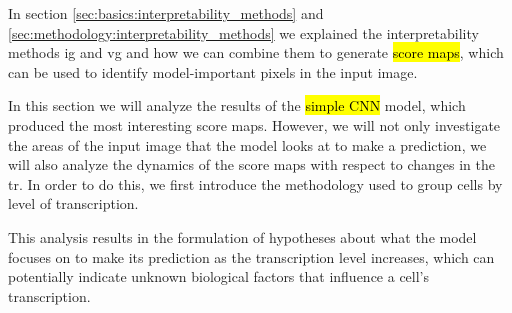 
\glsresetall
\graphicspath{{./Sections/Results/Resources/}}

In section \ref{sec:basics:interpretability_methods} and \ref{sec:methodology:interpretability_methods} we explained the interpretability methods \gls{ig} and \gls{vg} and how we can combine them to generate \hl{score maps}, which can be used to identify model-important pixels in the input image.

In this section we will analyze the results of the \hl{simple CNN} model, which produced the most interesting score maps. However, we will not only investigate the areas of the input image that the model looks at to make a prediction, we will also analyze the dynamics of the score maps with respect to changes in the \gls{tr}. In order to do this, we first introduce the methodology used to group cells by level of transcription.

This analysis results in the formulation of hypotheses about what the model focuses on to make its prediction as the transcription level increases, which can potentially indicate unknown biological factors that influence a cell's transcription.
